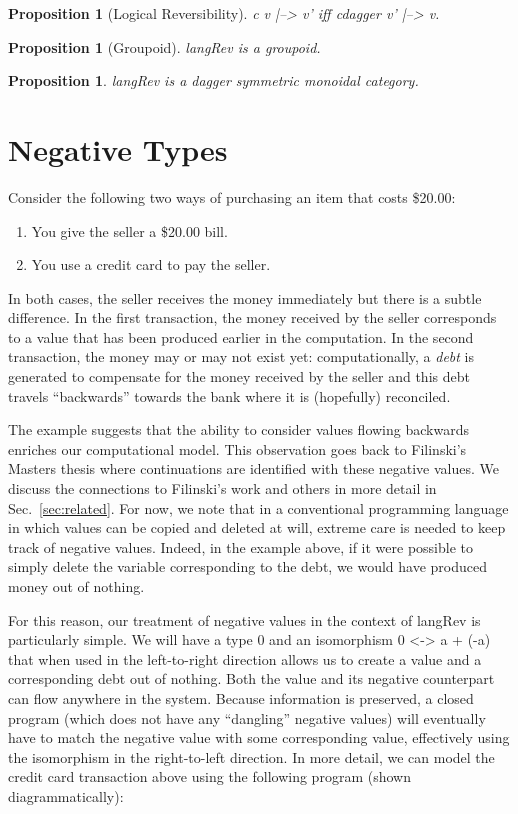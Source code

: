 \documentclass[preprint]{sigplanconf}
\newtheorem{proposition}[theorem]{Proposition}
\begin{document}
\begin{proposition}[Logical Reversibility]
\label{prop:logrev}
{{c v |--> v'}} iff {{c{dagger} v' |--> v}}.
\end{proposition}

\begin{proposition}[Groupoid]
\label{prop:groupoid}
{{langRev}} is a groupoid. 
\end{proposition}

\begin{proposition}
\label{prop:category}
{{langRev}} is a dagger symmetric monoidal category. 
\end{proposition}

\section{Negative Types}
\label{sec:neg}

Consider the following two ways of purchasing an item that costs \$20.00:
\begin{enumerate}
\item You give the seller a \$20.00 bill.
\item You use a credit card to pay the seller.
\end{enumerate}
In both cases, the seller receives the money immediately but there is a
subtle difference. In the first transaction, the money received by the seller
corresponds to a value that has been produced earlier in the computation. In
the second transaction, the money may or may not exist yet: computationally,
a \emph{debt} is generated to compensate for the money received by the seller
and this debt travels ``backwards'' towards the bank where it is (hopefully)
reconciled.

The example suggests that the ability to consider values flowing backwards
enriches our computational model. This observation goes back to Filinski's
Masters thesis where continuations are identified with these negative values.
We discuss the connections to Filinski's work and others in more detail in
Sec.~\ref{sec:related}. For now, we note that in a conventional programming
language in which values can be copied and deleted at will, extreme care is
needed to keep track of negative values. Indeed, in the example above, if it
were possible to simply delete the variable corresponding to the debt, we
would have produced money out of nothing. 

For this reason, our treatment of negative values in the context of
{{langRev}} is particularly simple. We will have a type $0$ and an
isomorphism {{0 <-> a + (-a)}} that when used in the left-to-right direction
allows us to create a value and a corresponding debt out of nothing. Both the
value and its negative counterpart can flow anywhere in the system. Because
information is preserved, a closed program (which does not have any
``dangling'' negative values) will eventually have to match the negative
value with some corresponding value, effectively using the isomorphism in the
right-to-left direction. In more detail, we can model the credit card
transaction above using the following program (shown diagrammatically):
\end{document}
